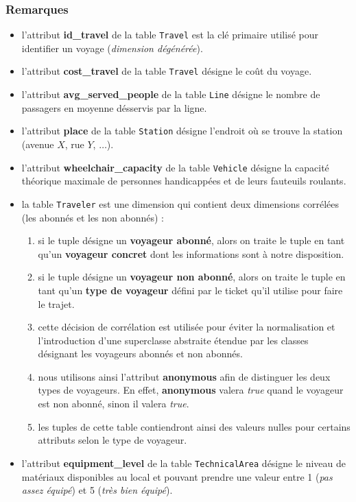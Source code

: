 \documentclass[a4paper,12pt]{report}
\begin{document}
\subsubsection{Remarques}
\begin{itemize}
  \item l'attribut \textbf{id\_travel} de la table \texttt{Travel} est la clé primaire utilisé pour identifier un voyage (\textit{dimension dégénérée}).
  \item l'attribut \textbf{cost\_travel} de la table \texttt{Travel} désigne le coût du voyage.
  \item l'attribut \textbf{avg\_served\_people} de la table \texttt{Line} désigne le nombre de passagers en moyenne désservis par la ligne.
  \item l'attribut \textbf{place} de la table \texttt{Station} désigne l'endroit où se trouve la station (avenue $X$, rue $Y$, $\dots$).
  \item l'attribut \textbf{wheelchair\_capacity} de la table \texttt{Vehicle} désigne la capacité théorique maximale de personnes handicappées et de leurs fauteuils roulants.
  \item la table \texttt{Traveler} est une dimension qui contient deux dimensions corrélées (les abonnés et les non abonnés) :
  \begin{enumerate}
    \item si le tuple désigne un \textbf{voyageur abonné}, alors on traite le tuple en tant qu'un \textbf{voyageur concret} dont les informations sont à notre disposition.
    \item si le tuple désigne un \textbf{voyageur non abonné}, alors on traite le tuple en tant qu'un \textbf{type de voyageur} défini par le ticket qu'il utilise pour faire le trajet.
    \item cette décision de corrélation est utilisée pour éviter la normalisation et l'introduction d'une superclasse abstraite étendue par les classes désignant les voyageurs abonnés et non abonnés.
    \item nous utilisons ainsi l'attribut \textbf{anonymous} afin de distinguer les deux types de voyageurs. En effet, \textbf{anonymous} valera \textit{true} quand le voyageur est non abonné, sinon il valera \textit{true}.
    \item les tuples de cette table contiendront ainsi des valeurs nulles pour certains attributs selon le type de voyageur.
  \end{enumerate}
  \item l'attribut \textbf{equipment\_level} de la table \texttt{TechnicalArea} désigne le niveau de matériaux disponibles au local et pouvant prendre une valeur entre 1 (\textit{pas assez équipé}) et 5 (\textit{très bien équipé}).
\end{itemize}
\end{document}
